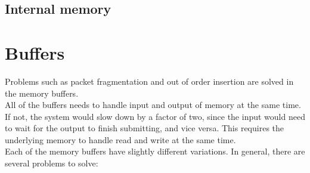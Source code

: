 \subsection{Internal memory}


\section{Buffers}
Problems such as packet fragmentation and out of order insertion are solved in
the memory buffers.\\
All of the buffers needs to handle input and output of
memory at the same time. If not, the system would slow down by a factor of two,
since the input would need to wait for the output to finish submitting, and
vice versa. This requires the underlying memory to handle read and write at the
same time. \\
Each of the memory buffers have slightly different variations. In general, there
are several problems to solve:

